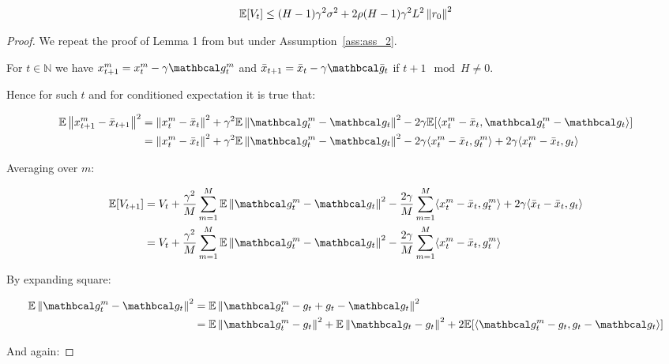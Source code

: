 \begin{lemma} \label{lem:lemma_Vt}
    \begin{align}
        \mathbb{E} [V_t] 
        \leq
        (H-1) \gamma^2 \sigma^2 + 2 \rho (H-1) \gamma^2 L^2 \left\|r_0\right\|^2
    \end{align}
\end{lemma}
\begin{proof}
    We repeat the proof of Lemma 1 from \cite{Khaled} but under Assumption~\ref{ass:ass_2}.

    For $t \in \mathbb{N}$ we have $x^m_{t+1} = x^m_t - \gamma \mc{g}^m_t$ 
    and $\bar{x}_{t+1} = \bar{x}_t - \gamma \mc{\bar{g}}_t$
    if $t + 1 \mod H \neq 0$. 
    
    Hence for such $t$ and for conditioned expectation it is true that:

    \begin{align}
        \E \norm{x^m_{t+1} - \bar{x}_{t+1}}^2 
        &= \norm{x^m_t - \bar{x}_t}^2 + \gamma^2 \E \norm{\mc{g}^m_t - \mc{g}_t}^2 - 2\gamma \E [\inner{x^m_t - \bar{x}_t}{\mc{g}^m_t - \mc{g}_t}] \\
        &= \norm{x^m_t - \bar{x}_t}^2 + \gamma^2 \E \norm{\mc{g}^m_t - \mc{g}_t}^2 - 2\gamma \inner{x^m_t - \bar{x}_t}{g^m_t} + 2\gamma \inner {x^m_t - \bar{x}_t}{g_t}
    \end{align}

    Averaging over $m$:

    \begin{align}
        \E [V_{t+1}] 
        &=
        V_t + \frac{\gamma^2}{M} \summ{m=1}{M} \E \norm{\mc{g}^m_t - \mc{g}_t}^2 - \frac{2\gamma}{M} \summ{m=1}{M} \inner{x^m_t - \bar{x}_t}{g^m_t} + 2\gamma \inner {\bar{x}_t - \bar{x}_t}{g_t}  \\
        &=
        V_t + \frac{\gamma^2}{M} \summ{m=1}{M} \E \norm{\mc{g}^m_t - \mc{g}_t}^2 - \frac{2\gamma}{M} \summ{m=1}{M} \inner{x^m_t - \bar{x}_t}{g^m_t} \label{eq:1904_4}
    \end{align}

    By expanding square:

    \begin{align} 
        \E \norm{\mc{g}^m_t - \mc{g}_t}^2
        &= \E \norm{\mc{g}^m_t - g_t + g_t - \mc{g}_t}^2 \\
        &= 
        \E \norm{\mc{g}^m_t - g_t}^2 + \E \norm{\mc{g}_t - g_t}^2 + 2\E [\inner{\mc{g}^m_t - g_t}{g_t - \mc{g}_t}] \label{eq:1904_1}
    \end{align}

    And again:


\end{proof}
